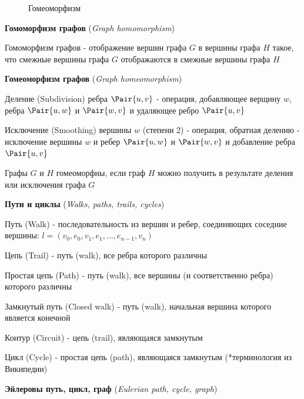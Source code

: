 \documentclass[12pt]{article}
\begin{document}
\begin{enumerate}
\begin{minipage}{\linewidth}
\begin{figure}
\begin{center}
                    Гомеоморфизм
                \end{center}
            \end{figure}

            \smallvspace

            \item \textbf{Гомоморфизм графов} (\textit{Graph homomorphism})

            Гомоморфизм графов - отображение вершин графа $G$ в вершины графа $H$ такое,
            что смежные вершины графа $G$ отображаются в смежные вершины графа $H$


            \item \textbf{Гомеоморфизм графов} (\textit{Graph homeomorphism})

            Деление (Subdivision) ребра $\Pair{u, v}$ - операция, добавляющее верщину $w$, ребра $\Pair{u, w}$ и $\Pair{w, v}$ и удаляющее ребро $\Pair{u, v}$

            Исключение (Smoothing) вершины $w$ (степени 2) - операция, обратная делению - исключение вершины $w$ и ребер $\Pair{u, w}$ и $\Pair{w, v}$ и добавление ребра $\Pair{u, v}$

            Графы $G$ и $H$ гомеоморфны, если граф $H$ можно получить в результате деления или исключения графа $G$

        \end{minipage}

        \smallvspace

        \item \textbf{Пути и циклы} (\textit{Walks, paths, trails, cycles})

        Путь (Walk) - последовательность из вершин и ребер, соединяющих соседние вершины: $l = (v_0, e_0, v_1, e_1, \dots, e_{n - 1}, v_n)$

        Цепь (Trail) - путь (walk), все ребра которого различны

        Простая цепь (Path) - путь (walk), все вершины (и соответственно ребра) которого различны

        Замкнутый путь (Closed walk) - путь (walk), начальная вершина которого является конечной

        Контур (Circuit) - цепь (trail), являющаяся замкнутым

        Цикл (Cycle) - простая цепь (path), являющаяся замкнутым \hfill (*терминология из Википедии)


        \item \textbf{Эйлеровы путь, цикл, граф} (\textit{Eulerian path, cycle, graph})


\end{enumerate}
\end{document}
